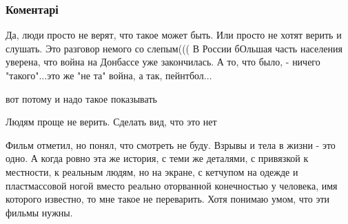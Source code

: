  
 
 
 
 
\subsubsection{Коментарі}
\label{sec:16_08_2021.fb.puchkova_irina.1.pro_filmy_i_zhizn_solncepek.cmt}

\begin{itemize}
 

Да, люди просто не верят, что такое может быть. Или просто не хотят верить и
слушать. Это разговор немого со слепым((( В России бОльшая часть населения
уверена, что война на Донбассе уже закончилась. А то, что было, - ничего
"такого"...это же "не та" война, а так, пейнтбол...


 
вот потому и надо такое показывать

 
Людям проще не верить. Сделать вид, что это нет

 

Фильм отметил, но понял, что смотреть не буду. Взрывы и тела в жизни - это
одно. А когда ровно эта же история, с теми же деталями, с привязкой к
местности, к реальным людям, но на экране, с кетчупом на одежде и пластмассовой
ногой вместо реально оторванной конечностью у человека, имя которого известно,
то мне такое не переварить. Хотя понимаю умом, что эти фильмы нужны.



\end{itemize}
